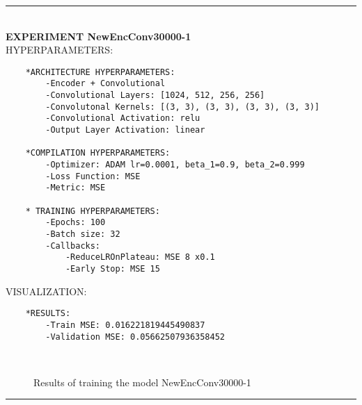 \rule{0.5\textwidth}{0.5pt}\\

	{\large \textbf{EXPERIMENT NewEncConv30000-1}}\\
	
	{\normalsize HYPERPARAMETERS:}
	\begin{lstlisting}	
	*ARCHITECTURE HYPERPARAMETERS:
		-Encoder + Convolutional
		-Convolutional Layers: [1024, 512, 256, 256]
		-Convolutonal Kernels: [(3, 3), (3, 3), (3, 3), (3, 3)]
		-Convolutional Activation: relu
		-Output Layer Activation: linear
	
	*COMPILATION HYPERPARAMETERS:
		-Optimizer: ADAM lr=0.0001, beta_1=0.9, beta_2=0.999
		-Loss Function: MSE
		-Metric: MSE
	
	* TRAINING HYPERPARAMETERS:
		-Epochs: 100
		-Batch size: 32
		-Callbacks:
			-ReduceLROnPlateau: MSE 8 x0.1
			-Early Stop: MSE 15
	\end{lstlisting}
	
	{\normalsize VISUALIZATION:}
	\begin{lstlisting}
	*RESULTS:
        -Train MSE: 0.016221819445490837
        -Validation MSE: 0.05662507936358452
	\end{lstlisting}
	
	\begin{figure*}[ht!]
		\hspace{\fill}
		\hspace{\fill}
		\\
		\caption{Results of training the model NewEncConv30000-1}
	\end{figure*}
	
\FloatBarrier	
\rule{0.5\textwidth}{0.5pt}\\